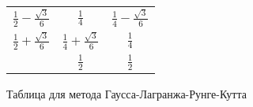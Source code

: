 \begin{figure}[h]
    \renewcommand{\arraystretch}{1.8}
    \centering
    \begin{tabular}{c|cc}
        $\frac12 - \frac{\sqrt3}6$ & $\frac14$                  & $\frac14 - \frac{\sqrt3}6$ \\
        $\frac12 + \frac{\sqrt3}6$ & $\frac14 + \frac{\sqrt3}6$ & $\frac14$ \\ \hline
                                   & $\frac12$                  & $\frac12$
    \end{tabular}
    \caption{Таблица для метода Гаусса-Лагранжа-Рунге-Кутта}
\label{tab:gauss-lagr}
\end{figure}

